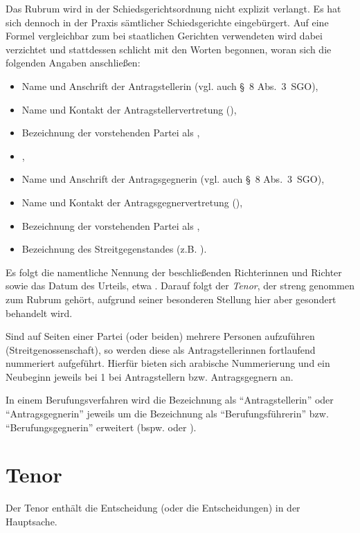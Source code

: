 Das Rubrum wird in der Schiedsgerichtsordnung nicht explizit verlangt. Es hat sich dennoch in der Praxis sämtlicher Schiedsgerichte eingebürgert. Auf eine Formel vergleichbar zum bei staatlichen Gerichten verwendeten  wird dabei verzichtet und stattdessen schlicht mit den Worten  begonnen, woran sich die folgenden Angaben anschließen:
\begin{itemize}
\item Name und Anschrift der Antragstellerin (vgl. auch \S~8 Abs.~3~SGO),
\item Name und Kontakt der Antragstellervertretung (),
\item Bezeichnung der vorstehenden Partei als ,
\item {},
\item Name und Anschrift der Antragsgegnerin (vgl. auch \S~8 Abs.~3~SGO),
\item Name und Kontakt der Antragsgegnervertretung (),
\item Bezeichnung der vorstehenden Partei als ,
\item Bezeichnung des Streitgegenstandes (z.B. ).
\end{itemize}

Es folgt die namentliche Nennung der beschließenden Richterinnen und Richter sowie das Datum des Urteils, etwa . Darauf folgt der \emph{Tenor}, der streng genommen zum Rubrum gehört, aufgrund seiner besonderen Stellung hier aber gesondert behandelt wird.

Sind auf Seiten einer Partei (oder beiden) mehrere Personen aufzuführen (Streitgenossenschaft), so werden diese als Antragstellerinnen fortlaufend nummeriert aufgeführt. Hierfür bieten sich arabische Nummerierung und ein Neubeginn jeweils bei 1 bei Antragstellern bzw. Antragsgegnern an.

In einem Berufungsverfahren wird die Bezeichnung als \enquote{Antragstellerin} oder \enquote{Antragsgegnerin} jeweils um die Bezeichnung als \enquote{Berufungsführerin} bzw. \enquote{Berufungsgegnerin} erweitert (bspw.  oder ).

\section{Tenor}
Der Tenor enthält die Entscheidung (oder die Entscheidungen) in der Hauptsache.

